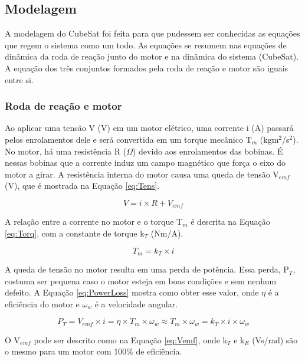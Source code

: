 \documentclass[
	12pt,				%
	openany,			%
	twoside,			%
	a4paper,			%
	english,			%
	french,				%
	spanish,			%
	brazil,				%
	oldfontcommands
	]{abntex2}
\begin{document}
\subsection{Modelagem}

A modelagem do CubeSat foi feita para que pudessem ser conhecidas as equações que regem o sistema como um todo. As equações se resumem nas equações de dinâmica da roda de reação junto do motor e na dinâmica do sistema (CubeSat). A equação dos três conjuntos formados pela roda de reação e motor são iguais entre si.

\subsubsection{Roda de reação e motor}

Ao aplicar uma tensão V (V) em um motor elétrico, uma corrente i (A) passará pelos enrolamentos dele e será convertida em um torque mecânico T$_{m}$ (kgm$^{2}$/s$^{2}$). No motor, há uma resistência R ($\Omega$) devido aos enrolamentos das bobinas. É nessas bobinas que a corrente induz um campo magnético que força o eixo do motor a girar. A resistência interna do motor causa uma queda de tensão V$_{emf}$ (V), que é mostrada na Equação \ref{eq:Tens}.

\begin{equation}
V = i \times R + V_{emf}
\label{eq:Tens}
\end{equation}

A relação entre a corrente no motor e o torque T$_{m}$ é descrita na Equação \ref{eq:Torq}, com a constante de torque k$_{T}$ (Nm/A).

\begin{equation}
T_{m} = k_{T} \times i
\label{eq:Torq}
\end{equation}

A queda de tensão no motor resulta em uma perda de potência. Essa perda, P$_{T}$, costuma ser pequena caso o motor esteja em boas condições e sem nenhum defeito. A Equação \ref{eq:PowerLoss} mostra como obter esse valor, onde $\eta$ é a eficiência do motor e $\omega_{w}$ é a velocidade angular.

\begin{equation}
P_{T} = V_{emf} \times i = \eta \times T_{m} \times \omega_{w} \approx T_{m} \times \omega_{w} = k_{T} \times i \times \omega_{w}
\label{eq:PowerLoss}
\end{equation}

O V$_{emf}$ pode ser descrito como na Equação \ref{eq:Vemf}, onde k$_{T}$ e k$_{E}$ (Vs/rad) são o mesmo para um motor com 100\% de eficiência.
\end{document}
